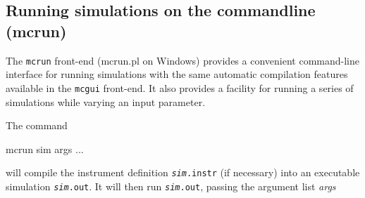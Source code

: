 \subsection{Running simulations on the commandline (mcrun)}
\label{s:mcrun}

The \verb+mcrun+ front-end (mcrun.pl on Windows) provides a convenient
command-line interface for running simulations with the same automatic
compilation features available in the \verb+mcgui+ front-end. It also provides a
facility for running a series of simulations while varying an input parameter.

The command

\begin{bash}
mcrun sim args ...
\end{bash}

will compile the instrument definition \texttt{\textit{sim}.instr} (if
necessary) into an executable simulation \texttt{\textit{sim}.out}. It
will then run \texttt{\textit{sim}.out}, passing the argument list \textit{
  args}

